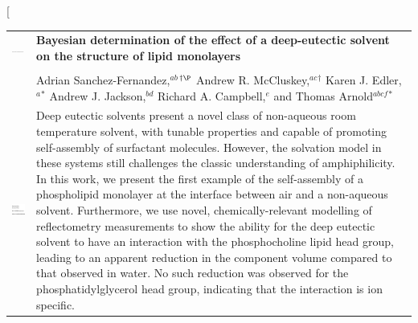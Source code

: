 \documentclass[twoside,twocolumn,9pt]{article}
\begin{document}
\twocolumn[
  \begin{@twocolumnfalse}
\vspace{3cm}
\sffamily
\begin{tabular}{m{4.5cm} p{13.5cm} }

\includegraphics{head_foot/DOI} & \noindent\LARGE{\textbf{Bayesian determination of the effect of a deep-eutectic solvent on the structure of lipid monolayers}} \\%
\vspace{0.3cm} & \vspace{0.3cm} \\

 & \noindent\large{Adrian Sanchez-Fernandez,\textit{$^{ab}$}$^{\dag\P}$ Andrew R. McCluskey,\textit{$^{ac}$}$^{\dag}$ Karen J. Edler,\textit{$^{a}$}$^{\ast}$ Andrew J. Jackson,\textit{$^{bd}$} Richard A. Campbell,\textit{$^{e}$} and Thomas Arnold\textit{$^{abcf}$}$^{\ast}$} \\%

\includegraphics{head_foot/dates} & \noindent\normalsize{Deep eutectic solvents present a novel class of non-aqueous room temperature solvent, with tunable properties and capable of promoting self-assembly of surfactant molecules. However, the solvation model in these systems still challenges the classic understanding of amphiphilicity. In this work, we present the first example of the self-assembly of a phospholipid monolayer at the interface between air and a non-aqueous solvent. Furthermore, we use novel, chemically-relevant modelling of reflectometry measurements to show the ability for the deep eutectic solvent to have an interaction with the phosphocholine lipid head group, leading to an apparent reduction in the component volume compared to that observed in water. No such reduction was observed for the phosphatidylglycerol head group, indicating that the interaction is ion specific.} \\

\end{tabular}

	\end{@twocolumnfalse} \vspace{0.6cm}
\end{document}

